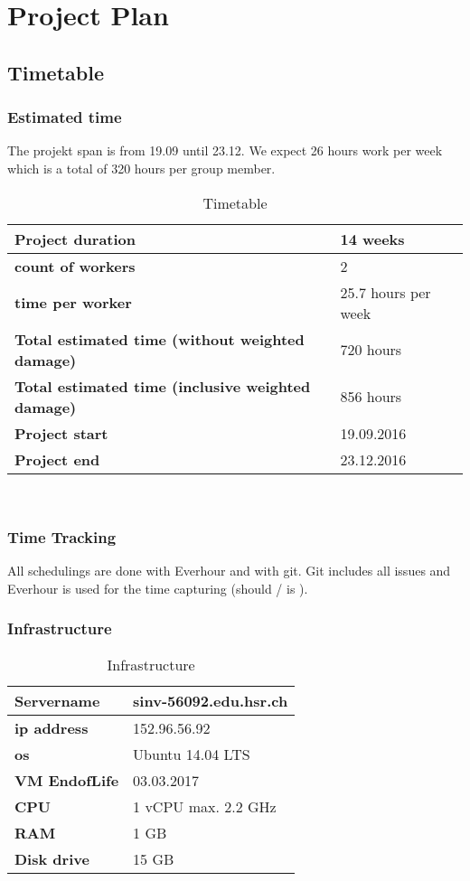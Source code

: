 \chapter{Project Plan}
\section{Timetable}
\subsection{Estimated time}
The projekt span is from 19.09 until 23.12. We expect 26 hours work per week which is a total of
320 hours per group member.

\begin{table}[H]
  \centering
  \scriptsize
  \caption{Timetable}
  \begin{tabular}{|p{80mm}|p{15mm}|}
    \hline 	\bf Project duration & 14 weeks \\ \hline
	\bf count of workers & 2 \\ \hline
	\bf time per worker & 25.7 hours per week \\ \hline
	\bf Total estimated time (without weighted damage) & 720 hours \\ \hline
	\bf Total estimated time (inclusive weighted damage) & 856 hours \\ \hline
	\bf Project start & 19.09.2016 \\ \hline
	\bf Project end & 23.12.2016 \\ \hline
  \end{tabular} \\
\end{table}

\subsection{Time Tracking}
All schedulings are done with Everhour and with git. Git includes all issues and Everhour is used for the time capturing (should / is ).

\subsection{Infrastructure}
\begin{table}[H]
  \centering
  \scriptsize
  \caption{Infrastructure}
  \begin{tabular}{|p{25mm}|p{30mm}|}
    \hline 	\bf Servername & sinv-56092.edu.hsr.ch \\ \hline
	\bf ip address & 152.96.56.92 \\ \hline
	\bf os & Ubuntu 14.04 LTS \\ \hline
	\bf VM EndofLife & 03.03.2017 \\ \hline
	\bf CPU & 1 vCPU max. 2.2 GHz \\ \hline
	\bf RAM & 1 GB \\ \hline
	\bf Disk drive & 15 GB \\ \hline
  \end{tabular} \\
\end{table}

